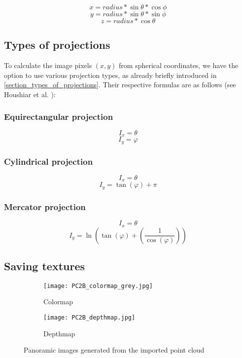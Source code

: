 $$x = radius * \sin \theta * \cos \phi$$
$$y = radius * \sin \theta * \sin \phi$$
$$z = radius * \cos \theta$$

\subsection{Types of projections}

To calculate the image pixels {$(x, y)$} from spherical coordinates, we have the option to use various projection types, as already briefly introduced in \ref{section_types_of_projections}. Their respective formulas are as follows (see Houshiar et al. \parencite{houshiar2015a}):

\subsubsection{Equirectangular projection}

$$I_x = \theta$$
$$I_y = \varphi$$

\subsubsection{Cylindrical projection}

$$I_x = \theta$$
$$I_y = \tan(\varphi) + \pi$$

\subsubsection{Mercator projection}

$$I_x = \theta$$
$$I_y = \ln \left(  \tan \left( \varphi \right) +  \left( \frac{1}{ \cos(\varphi) } \right) \right)$$

\subsection{Saving textures}

\begin{figure}[h]
	\centering
	\begin{subfigure}[b]{0.45\textwidth}
		\centering
		\texttt{[image: PC2B\_colormap\_grey.jpg]}
		\caption{Colormap}
		\label{fig:PC2B_colormap_grey}
	\end{subfigure}
	\hfill
	\begin{subfigure}[b]{0.45\textwidth}
		\centering
		\texttt{[image: PC2B\_depthmap.jpg]}
		\caption{Depthmap}
		\label{fig:PC2B_depthmap}
	\end{subfigure}
	\caption{Panoramic images generated from the imported point cloud}
	\label{fig:PC2B_Panorama_images}
\end{figure}

